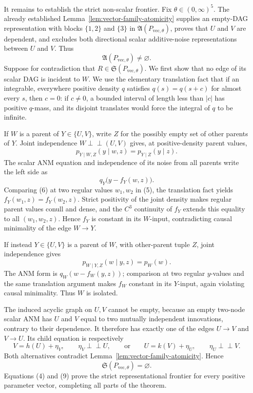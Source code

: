 It remains to establish the strict non-scalar frontier. Fix \(\theta\in(0,\infty)^5\). The already established Lemma~\ref{lem:vector-family-atomicity} supplies an empty-DAG representation with blocks \(\{1,2\}\) and \(\{3\}\) in \(\mathfrak A(P_{\mathrm{vec},\theta})\), proves that \(U\) and \(V\) are dependent, and excludes both directional scalar additive-noise representations between \(U\) and \(V\). Thus
\[
\mathfrak A(P_{\mathrm{vec},\theta})\neq\varnothing. \tag{4}
\]
Suppose for contradiction that \(R\in\mathfrak S(P_{\mathrm{vec},\theta})\). We first show that no edge of its scalar DAG is incident to \(W\). We use the elementary translation fact that if an integrable, everywhere positive density \(q\) satisfies \(q(s)=q(s+c)\) for almost every \(s\), then \(c=0\): if \(c\neq0\), a bounded interval of length less than \(|c|\) has positive \(q\)-mass, and its disjoint translates would force the integral of \(q\) to be infinite.

If \(W\) is a parent of \(Y\in\{U,V\}\), write \(Z\) for the possibly empty set of other parents of \(Y\). Joint independence \(W\perp\!\!\!\perp(U,V)\) gives, at positive-density parent values,
\[
p_{Y\mid W,Z}(y\mid w,z)=p_{Y\mid Z}(y\mid z). \tag{5}
\]
The scalar ANM equation and independence of its noise from all parents write the left side as
\[
q_Y\bigl(y-f_Y(w,z)\bigr). \tag{6}
\]
Comparing (6) at two regular values \(w_1,w_2\) in (5), the translation fact yields \(f_Y(w_1,z)=f_Y(w_2,z)\). Strict positivity of the joint density makes regular parent values conull and dense, and the \(C^3\) continuity of \(f_Y\) extends this equality to all \((w_1,w_2,z)\). Hence \(f_Y\) is constant in its \(W\)-input, contradicting causal minimality of the edge \(W\to Y\).

If instead \(Y\in\{U,V\}\) is a parent of \(W\), with other-parent tuple \(Z\), joint independence gives
\[
p_{W\mid Y,Z}(w\mid y,z)=p_W(w). \tag{7}
\]
The ANM form is \(q_W(w-f_W(y,z))\); comparison at two regular \(y\)-values and the same translation argument makes \(f_W\) constant in its \(Y\)-input, again violating causal minimality. Thus \(W\) is isolated.

The induced acyclic graph on \(U,V\) cannot be empty, because an empty two-node scalar ANM has \(U\) and \(V\) equal to two mutually independent innovations, contrary to their dependence. It therefore has exactly one of the edges \(U\to V\) and \(V\to U\). Its child equation is respectively
\[
V=h(U)+\eta_V,\qquad \eta_V\perp\!\!\!\perp U,
\qquad\text{or}\qquad
U=k(V)+\eta_U,\qquad \eta_U\perp\!\!\!\perp V. \tag{8}
\]
Both alternatives contradict Lemma~\ref{lem:vector-family-atomicity}. Hence
\[
\mathfrak S(P_{\mathrm{vec},\theta})=\varnothing. \tag{9}
\]
Equations (4) and (9) prove the strict representational frontier for every positive parameter vector, completing all parts of the theorem.